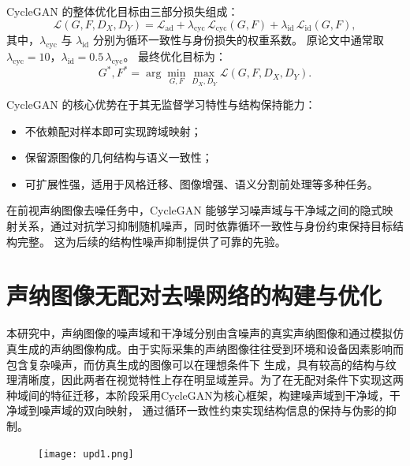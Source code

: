 CycleGAN 的整体优化目标由三部分损失组成：
\begin{equation}
    \label{eq4}
    \mathcal{L}(G, F, D_X, D_Y)=\mathcal{L}_{\mathrm{ad}}+\lambda_\mathrm{cyc}\,\mathcal{L}_\mathrm{cyc}(G,F)+\lambda_\mathrm{id}\,\mathcal{L}_\mathrm{id}(G,F),
\end{equation}
其中，$\lambda_\mathrm{cyc}$ 与 $\lambda_\mathrm{id}$ 分别为循环一致性与身份损失的权重系数。
原论文中通常取 $\lambda_\mathrm{cyc}=10$，$\lambda_\mathrm{id}=0.5\,\lambda_\mathrm{cyc}$。
最终优化目标为：
\begin{equation}
	\label{eq5}
	G^*, F^* = \arg \min_{G,F} \max_{D_X, D_Y} \mathcal{L}(G, F, D_X, D_Y).
\end{equation}

CycleGAN 的核心优势在于其无监督学习特性与结构保持能力：
\begin{itemize}
    \item 不依赖配对样本即可实现跨域映射；
    \item 保留源图像的几何结构与语义一致性；
    \item 可扩展性强，适用于风格迁移、图像增强、语义分割前处理等多种任务。
\end{itemize}
在前视声纳图像去噪任务中，CycleGAN 能够学习噪声域与干净域之间的隐式映射关系，通过对抗学习抑制随机噪声，同时依靠循环一致性与身份约束保持目标结构完整。
这为后续的结构性噪声抑制提供了可靠的先验。





\section{声纳图像无配对去噪网络的构建与优化}
本研究中，声纳图像的噪声域和干净域分别由含噪声的真实声纳图像和通过模拟仿真生成的声纳图像构成。由于实际采集的声纳图像往往受到环境和设备因素影响而包含复杂噪声，而仿真生成的图像可以在理想条件下
生成，具有较高的结构与纹理清晰度，因此两者在视觉特性上存在明显域差异。为了在无配对条件下实现这两种域间的特征迁移，本阶段采用CycleGAN为核心框架，构建噪声域到干净域，干净域到噪声域的双向映射，
通过循环一致性约束实现结构信息的保持与伪影的抑制。

\begin{figure}[ht]
	\centering
	\texttt{[image: upd1.png]}
	\caption{}
	\label{fig:upd1}
\end{figure}
	

